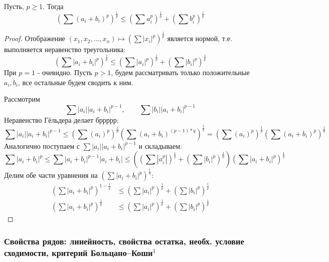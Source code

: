 \documentclass{article}
\begin{document}
Пусть, $p \geq 1$. Тогда
\begin{equation*}
\left(\sum(a_i + b_i)^p\right)^\frac{1} {p} \leq \left(\sum a_i^p\right)^\frac{1} {p} + \left(\sum b_i^p\right) ^\frac{1} {p}
\end{equation*}
\begin{proof}
Отображение $(x_1, x_2, \dots, x_n) \mapsto \left( \sum |x_i|^p\right)^\frac{1} {p}$ является нормой, т.е. выполняется неравенство треугольника:
\begin{equation*}
\left( \sum|a_i + b_i|^p\right)^\frac{1} {p} \leq  \left( \sum |a_i|^p\right)^\frac{1} {p} + \left( \sum |b_i|^p\right)^\frac{1} {p}
\end{equation*}
При $p = 1$ - очевидно.
Пусть $p > 1$, будем рассматривать только положительные $a_i, b_i$, все остальные будем сводить к ним.

Рассмотрим 
\begin{equation*}
\sum |a_i| |a_i + b_i|^{p - 1}, \qquad \sum|b_i| |a_i + b_i|^{p - 1}
\end{equation*}
Неравенство Гёльдера делает бррррр:
\begin{equation*}
\sum |a_i| |a_i + b_i|^{p - 1} \leq \left(\sum (a_i)^p\right)^\frac{1} {p} \left(\sum(a_i + b_i)^{(p - 1) * q}\right)^\frac{1} {q} = \left(\sum (a_i)^p\right)^\frac{1} {p} \left(\sum (a_i + b_i)^p\right)^\frac{1} {q}
\end{equation*}
Аналогично поступаем с $\sum |a_i| |a_i + b_i|^{p - 1} $ и складываем:
\begin{equation*}
\sum |a_i + b_i|^p \leq \sum |a_i + b_i| ^{p - 1} |a_i + b_i| \leq \left(\left(\sum|a_i^p|\right)^\frac{1} {p} + \left(\sum|b_i|^p\right)^\frac{1} {p}\right) \left(\sum|a_i + b_i|^p\right)^\frac{1} {q}
\end{equation*}
Делим обе части уравнения на $\left(\sum|a_i + b_i|^p\right)^\frac{1} {q}$:
\begin{align*}
\left(\sum|a_i + b_i|^p\right) ^{1 - \frac{1} {q}} &\leq \left(\sum|a_i|^p\right)^\frac{1} {p} + \left(\sum|b_i|^p\right)^\frac{1} {p}\\
\left(\sum|a_i + b_i|^p\right) ^\frac{1} {p} &\leq \left(\sum|a_i|^p\right)^\frac{1} {p} + \left(\sum|b_i|^p\right)^\frac{1} {p}
\end{align*}
\end{proof}

\subsubsection{Свойства рядов: линейность, свойства остатка, необх. условие сходимости, критерий Больцано--Коши\texorpdfstring{$^1$}{}}
\end{document}
